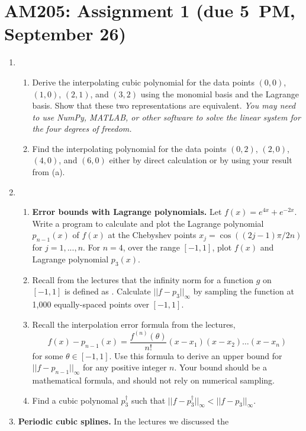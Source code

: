 \documentclass[12pt]{article}
\begin{document}
\section*{AM205: Assignment 1 (due 5~PM, September 26)}
\begin{enumerate}
  \item
    \begin{enumerate}
      \item Derive the interpolating cubic polynomial for the data points
	$(0,0)$, $(1,0)$, $(2,1)$, and $(3,2)$ using the monomial basis and the
	Lagrange basis. Show that these two representations are equivalent.
	{\it You may need to use NumPy, MATLAB, or other software to solve the
	linear system for the four degrees of freedom.}
      \item Find the interpolating polynomial for the data points $(0,2)$, $(2,0)$,
	$(4,0)$, and $(6,0)$ either by direct calculation or by using your result
	from (a).
    \end{enumerate}
  \item 
    \begin{enumerate}
      \item {\bf Error bounds with Lagrange polynomials.} Let
	$f(x)=e^{4x}+e^{-2x}$. Write a program to calculate and plot the
	Lagrange polynomial $p_{n-1}(x)$ of $f(x)$ at the Chebyshev points
	$x_j = \cos ((2j-1)\pi/2n)$ for $j = 1,...,n$. For $n=4$, over the
	range $[-1,1]$, plot $f(x)$ and Lagrange polynomial $p_3(x)$.
      \item Recall from the lectures that the infinity norm for a function $g$
	on $[-1,1]$ is defined as . Calculate $||f-p_3||_\infty$ by sampling the function at
	1,000 equally-spaced points over $[-1,1]$.
      \item Recall the interpolation error formula from the lectures,
	\begin{equation}
	  f(x)-p_{n-1}(x) = \frac{f^{(n)}(\theta)}{n!} (x-x_1)(x-x_2)\ldots(x-x_n)
        \end{equation}
	for some $\theta \in [-1,1]$. Use this formula to derive an upper
	bound for $||f-p_{n-1}||_\infty$ for any positive integer $n$. Your
	bound should be a mathematical formula, and should not rely on
	numerical sampling.
      \item Find a cubic polynomal $p_3^\dagger$ such that
	$||f-p_3^\dagger||_\infty<||f-p_3||_\infty$.
    \end{enumerate}
  \item {\bf Periodic cubic splines.} In the lectures we discussed the

\end{enumerate}
\end{document}
